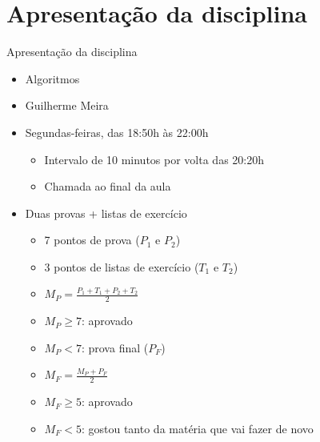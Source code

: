 \documentclass{beamer}
\begin{document}
  \section{Apresentação da disciplina}
  \begin{frame}{Apresentação da disciplina}
  	\begin{itemize}
  		\item[Disciplina] Algoritmos
  		\item[Professor] Guilherme Meira
	  	\item[Horário] Segundas-feiras, das 18:50h às 22:00h
		  	\begin{itemize}
		  		\item Intervalo de 10 minutos por volta das 20:20h
		  		\item Chamada ao final da aula
		  	\end{itemize}
		\item[Avaliação] Duas provas + listas de exercício
			\begin{itemize}
				\item 7 pontos de prova ($P_{1}$ e $P_{2}$)
				\item 3 pontos de listas de exercício ($T_{1}$ e $T_{2}$)
				\item $M_{P} = \frac{P_{1} + T_{1} + P_{2} + T_{2}}{2}$
				\item $M_{P} \ge 7$: aprovado
				\item $M_{P} < 7$: prova final ($P_{F}$)
				\item $M_{F} = \frac{M_{P} + P_{F}}{2}$
				\item $M_{F} \ge 5$: aprovado
				\item $M_{F} < 5$: gostou  tanto da matéria que vai fazer de novo
			\end{itemize}
  	\end{itemize}
  \end{frame}
\end{document}
